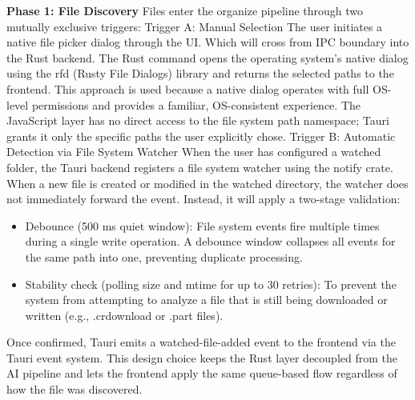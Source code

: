 \documentclass[12pt,oneside,openright,a4paper]{cpe-english-project}
\begin{document}
\textbf{Phase 1: File Discovery}
Files enter the organize pipeline through two mutually exclusive triggers:
Trigger A: Manual Selection
The user initiates a native file picker dialog through the UI. Which will cross from IPC boundary into the Rust backend. The Rust command opens the operating system's native dialog using the rfd (Rusty File Dialogs) library and returns the selected paths to the frontend. This approach is used because a native dialog operates with full OS-level permissions and provides a familiar, OS-consistent experience. The JavaScript layer has no direct access to the file system path namespace; Tauri grants it only the specific paths the user explicitly chose.
Trigger B: Automatic Detection via File System Watcher
When the user has configured a watched folder, the Tauri backend registers a file system watcher using the notify crate. When a new file is created or modified in the watched directory, the watcher does not immediately forward the event. Instead, it will apply a two-stage validation:
\begin{itemize}
\item Debounce (500 ms quiet window): File system events fire multiple times during a single write operation. A debounce window collapses all events for the same path into one, preventing duplicate processing.
\item Stability check (polling size and mtime for up to 30 retries): To prevent the system from attempting to analyze a file that is still being downloaded or written (e.g., .crdownload or .part files).
\end{itemize}
Once confirmed, Tauri emits a watched-file-added event to the frontend via the Tauri event system. This design choice keeps the Rust layer decoupled from the AI pipeline and lets the frontend apply the same queue-based flow regardless of how the file was discovered.
\vspace{0.2em}
\end{document}

